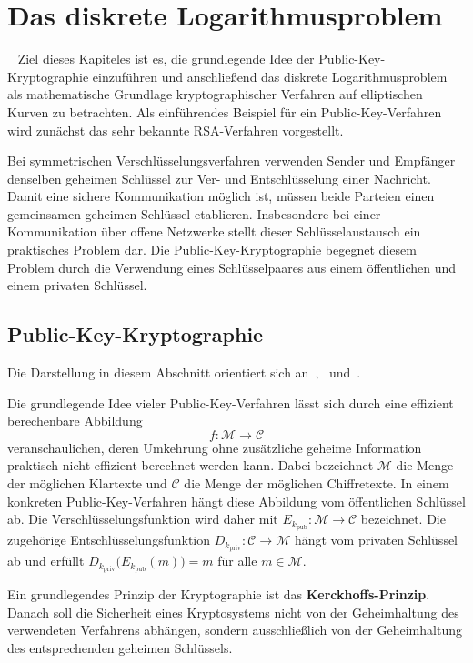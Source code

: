 \chapter{Das diskrete Logarithmusproblem}~\label{public-key}
Ziel dieses Kapiteles ist es, die grundlegende Idee der Public-Key-Kryptographie einzuführen und anschließend das diskrete Logarithmusproblem als mathematische Grundlage kryptographischer Verfahren auf elliptischen Kurven zu betrachten. Als einführendes Beispiel für ein Public-Key-Verfahren wird zunächst das sehr bekannte RSA-Verfahren vorgestellt. 

Bei symmetrischen Verschlüsselungsverfahren verwenden Sender und Empfänger denselben geheimen Schlüssel zur Ver- und Entschlüsselung einer Nachricht. Damit eine sichere Kommunikation möglich ist, müssen beide Parteien einen gemeinsamen geheimen Schlüssel etablieren. Insbesondere bei einer Kommunikation über offene Netzwerke stellt dieser Schlüsselaustausch ein praktisches Problem dar. Die Public-Key-Kryptographie begegnet diesem Problem durch die Verwendung eines Schlüsselpaares aus einem öffentlichen und einem privaten Schlüssel.
\section{Public-Key-Kryptographie}
Die Darstellung in diesem Abschnitt orientiert sich an~\cite[S.~4, 109, 140]{fuß25},~\cite[S.~10]{buell24} und~\cite[S.~170]{washington08}.

Die grundlegende Idee vieler Public-Key-Verfahren lässt sich durch eine effizient berechenbare Abbildung
\[
    f:\mathcal{M}\longrightarrow\mathcal{C}
\]
veranschaulichen, deren Umkehrung ohne zusätzliche geheime Information praktisch nicht effizient berechnet werden kann. Dabei bezeichnet $\mathcal{M}$ die Menge der möglichen Klartexte und $\mathcal{C}$ die Menge der möglichen Chiffretexte. In einem konkreten Public-Key-Verfahren hängt diese Abbildung vom öffentlichen Schlüssel ab. Die Verschlüsselungsfunktion wird daher mit \(E_{k_{\mathrm{pub}}}:\mathcal{M}\longrightarrow\mathcal{C}\) bezeichnet. Die zugehörige Entschlüsselungsfunktion \( D_{k_{\mathrm{priv}}}:\mathcal{C}\longrightarrow\mathcal{M}\) hängt vom privaten Schlüssel ab und erfüllt \( D_{k_{\mathrm{priv}}} \bigl(E_{k_{\mathrm{pub}}}(m)\bigr) = m \) für alle $m\in\mathcal{M}$.

Ein grundlegendes Prinzip der Kryptographie ist das \textbf{Kerckhoffs-Prinzip}. Danach soll die Sicherheit eines Kryptosystems nicht von der Geheimhaltung des verwendeten Verfahrens abhängen, sondern ausschließlich von der Geheimhaltung des
entsprechenden geheimen Schlüssels.

